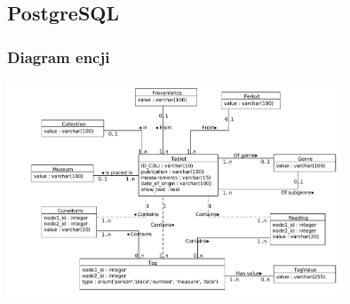 \subsection{PostgreSQL}
\begin{frame}
 \frametitle{Diagram encji}
 \includegraphics[width=100mm]{../diagramy/diagram-encji-maly.pdf}
\end{frame}
